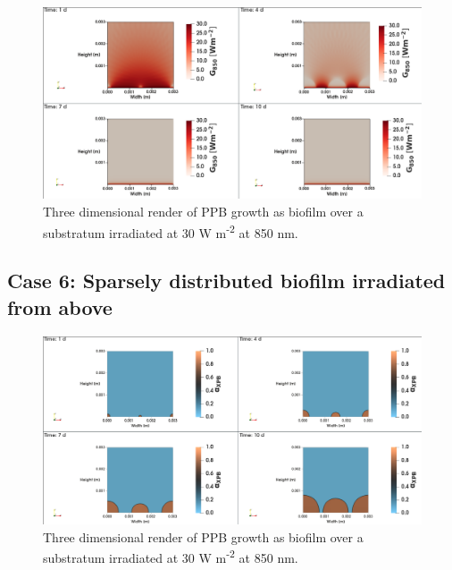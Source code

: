 \begin{figure}[H]
    \centering
    \includegraphics[width=\textwidth,height=0.4\textheight]{Chap4/results/post_processing/2D_cases/case5_rad.png}
    \caption{Three dimensional render of PPB growth as biofilm over a substratum irradiated at 30 W m\textsuperscript{-2} at 850 nm. } 
    \label{fig:case5_3D_rad}
\end{figure}

\subsection{Case 6: Sparsely distributed biofilm irradiated from above}
\begin{figure}[H]
    \centering
    \includegraphics[width=\textwidth,height=0.4\textheight]{Chap4/results/post_processing/2D_cases/case6_ppb.png}
    \caption{Three dimensional render of PPB growth as biofilm over a substratum irradiated at 30 W m\textsuperscript{-2} at 850 nm. } 
    \label{fig:case5_3D_rad}
\end{figure}

